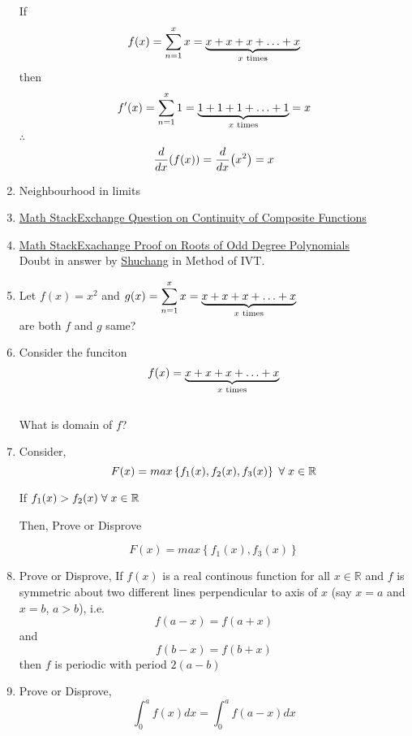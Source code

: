 \documentclass{article}
\begin{document}
\begin{enumerate}
            If $$f(x)=\displaystyle\sum_{n=1}^{x} x=\underbrace{x+x+x+\ldots +x}_{x \hspace{1mm} \text{times}}$$
            then $$f'(x)=\displaystyle\sum_{n=1}^{x} 1=\underbrace{1+1+1+\ldots+1}_{x \hspace{1mm} \text{times}}=x$$
            $\therefore$ $$\dv{x}(f(x))=\dv{x}(x^2)=x$$
      \item Neighbourhood in limits
      \item \href{https://math.stackexchange.com/questions/4892287/is-this-result-on-continuity-of-composite-functions-true}{Math StackExchange Question on Continuity of Composite Functions}
      \item \href{https://math.stackexchange.com/questions/689575/proof-that-every-polynomial-of-odd-degree-has-one-real-root}{Math StackExachange Proof on Roots of Odd Degree Polynomials } \\ Doubt in answer by  \href{https://math.stackexchange.com/users/91982/shuchang}{Shuchang} in Method of IVT.
      \item Let $f(x)=x^2$ and $g(x)=\displaystyle\sum_{n=1}^{x}x=\underbrace{x+x+x+\ldots +x}_{x \hspace{1mm} \text{times}}$
            \\ are both $f$ and $g$ same?
      \item Consider the funciton $$f(x)=\underbrace{x+x+x+\ldots+x}_{x \hspace{1mm} \text{times}}$$ \\
            What is domain of $f$?
      \item Consider, $$F(x)=max\left\{f_{1}(x),f_{2}(x),f_{3}(x)\right\} \hspace{1mm} \forall \hspace{1mm} x \in \mathbb{R}$$

            If $f_{1}(x) > f_{2}(x) \hspace{1mm} \forall \hspace{1mm} x \in \mathbb{R}$

            Then, Prove or Disprove

            $$F(x)=max\left\{f_{1}(x),f_{3}(x)\right\}$$
      \item Prove or Disprove,
            If $f(x)$ is a real continous function for all $x \in \mathbb{R}$ and $f$ is symmetric about two different lines perpendicular to axis of $x$ (say $x=a$ and $x=b$, $a>b$), i.e. $$f(a-x)=f(a+x) $$ and $$f(b-x)=f(b+x)$$ then $f$ is periodic with period $2(a-b)$
      \item Prove or Disprove,
            $$\displaystyle\int_{0}^{a} f(x) dx=\displaystyle\int_{0}^{a} f(a-x) dx$$
\end{enumerate}
\end{document}
